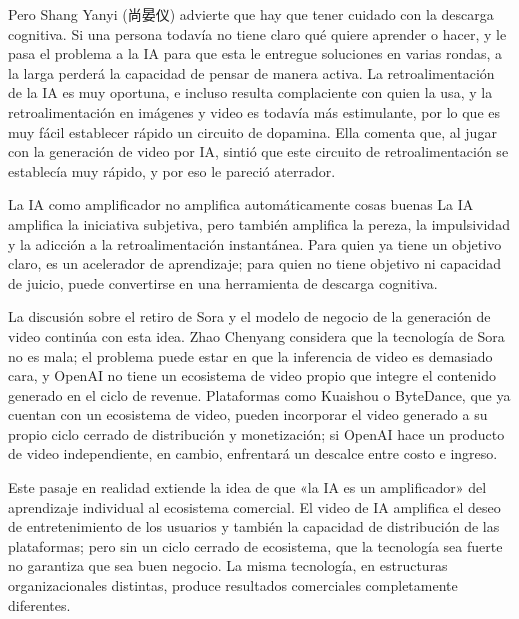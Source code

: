 \documentclass[a4paper]{article}
\begin{document}
Pero Shang Yanyi (尚晏仪) advierte que hay que tener cuidado con la descarga cognitiva. Si una persona todavía no tiene claro qué quiere aprender o hacer, y le pasa el problema a la IA para que esta le entregue soluciones en varias rondas, a la larga perderá la capacidad de pensar de manera activa. La retroalimentación de la IA es muy oportuna, e incluso resulta complaciente con quien la usa, y la retroalimentación en imágenes y video es todavía más estimulante, por lo que es muy fácil establecer rápido un circuito de dopamina. Ella comenta que, al jugar con la generación de video por IA, sintió que este circuito de retroalimentación se establecía muy rápido, y por eso le pareció aterrador.

\begin{warningbox}{La IA como amplificador no amplifica automáticamente cosas buenas}
La IA amplifica la iniciativa subjetiva, pero también amplifica la pereza, la impulsividad y la adicción a la retroalimentación instantánea. Para quien ya tiene un objetivo claro, es un acelerador de aprendizaje; para quien no tiene objetivo ni capacidad de juicio, puede convertirse en una herramienta de descarga cognitiva.
\end{warningbox}

La discusión sobre el retiro de Sora y el modelo de negocio de la generación de video continúa con esta idea. Zhao Chenyang considera que la tecnología de Sora no es mala; el problema puede estar en que la inferencia de video es demasiado cara, y OpenAI no tiene un ecosistema de video propio que integre el contenido generado en el ciclo de revenue. Plataformas como Kuaishou o ByteDance, que ya cuentan con un ecosistema de video, pueden incorporar el video generado a su propio ciclo cerrado de distribución y monetización; si OpenAI hace un producto de video independiente, en cambio, enfrentará un descalce entre costo e ingreso.

Este pasaje en realidad extiende la idea de que «la IA es un amplificador» del aprendizaje individual al ecosistema comercial. El video de IA amplifica el deseo de entretenimiento de los usuarios y también la capacidad de distribución de las plataformas; pero sin un ciclo cerrado de ecosistema, que la tecnología sea fuerte no garantiza que sea buen negocio. La misma tecnología, en estructuras organizacionales distintas, produce resultados comerciales completamente diferentes.
\end{document}
